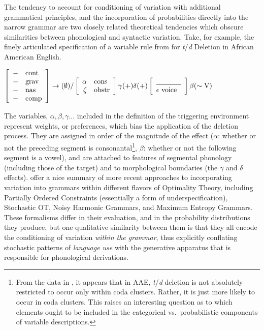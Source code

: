 The tendency to account for conditioning of variation with additional grammatical principles, and the incorporation of probabilities directly into the narrow grammar are two closely related theoretical tendencies which obscure similarities between phonological and syntactic variation.
Take, for example, the finely articulated specification of a variable rule from \citet{3288} for {\sl t}/{\sl d} Deletion in African American English.
\begin{exe}
 \ex $\left[\begin{array}{rl}
	-&\mbox{cont}\\
	-&\mbox{grav}\\
	-&\mbox{nas}\\
	-&\mbox{comp}
\end{array}\right] \rightarrow (\emptyset) / 
\left[
	\begin{array}{rl}
		\alpha & \mbox{cons}\\
		\zeta &  \mbox{obstr}
	\end{array}
\right]\gamma(\mbox{+})\delta(\mbox{+})
\left[
	\begin{array}{l}
	\underline{\hskip 35pt}\\
	\epsilon~\mbox{voice}
	\end{array}
\right]
\beta(\sim \mbox{V})$ \label{variable.rule}
\end{exe}
The variables, $\alpha, \beta, \gamma \ldots$ included in the definition of the triggering environment represent weights, or preferences, which bias the application of the deletion process. 
They are assigned in order of the magnitude of the effect ($\alpha$: whether or not the preceding segment is consonantal\footnote{From the data in \citet{3288}, it appears that in AAE, {\sl t}/{\sl d} deletion is not absolutely restricted to occur only within coda clusters.
Rather, it is just more likely to occur in coda clusters.
This raises an interesting question as to which elements ought to be included in the categorical vs.\ probabilistic components of variable descriptions.},
$\beta$: whether or not the following segment is a vowel), and are attached to features of segmental phonology (including those of the target) and to morphological boundaries (the $\gamma$ and $\delta$ effects).
\citet{Coetzee2011} offer a nice summary of more recent approaches to incorporating variation into grammars within different flavors of Optimality Theory, including Partially Ordered Constraints (essentially a form of underspecification), Stochastic OT, Noisy Harmonic Grammars, and Maximum Entropy Grammars.
These formalisms differ in their evaluation, and in the probability distributions they produce, but one qualitative similarity between them is that they all encode the conditioning of variation \emph{within the grammar}, thus explicitly conflating stochastic patterns of \textsl{language use} with the generative apparatus that is responsible for phonological derivations.
